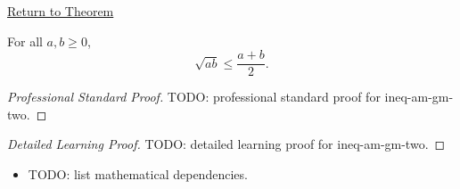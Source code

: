 \newpage
{}
\label{prf:ineq-am-gm-two}

\begin{remark*}[Return]
\hyperref[thm:ineq-am-gm-two]{Return to Theorem}
\end{remark*}

\begin{theorem*}
For all $a, b \ge 0$,
\[
  \sqrt{ab} \le \frac{a + b}{2}.
\]
\end{theorem*}

\begin{proof}[Professional Standard Proof]
\LRAProofBodyStart
TODO: professional standard proof for ineq-am-gm-two.
\end{proof}

\begin{proof}[Detailed Learning Proof]
\LRAProofBodyStart
TODO: detailed learning proof for ineq-am-gm-two.
\end{proof}

\begin{remark*}
\end{remark*}

\begin{dependencies}
\begin{itemize}
  \item TODO: list mathematical dependencies.
\end{itemize}
\end{dependencies}

\clearpage
